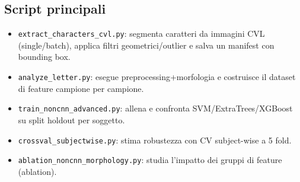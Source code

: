 \documentclass[a4paper,12pt]{article}
\begin{document}
\subsection{Script principali}
\begin{itemize}[leftmargin=1.5em]
  \item \texttt{extract\_characters\_cvl.py}: segmenta caratteri da immagini CVL (single/batch), applica filtri geometrici/outlier e salva un manifest con bounding box.
  \item \texttt{analyze\_letter.py}: esegue preprocessing+morfologia e costruisce il dataset di feature campione per campione.
  \item \texttt{train\_noncnn\_advanced.py}: allena e confronta SVM/ExtraTrees/XGBoost su split holdout per soggetto.
  \item \texttt{crossval\_subjectwise.py}: stima robustezza con CV subject-wise a 5 fold.
  \item \texttt{ablation\_noncnn\_morphology.py}: studia l'impatto dei gruppi di feature (ablation).
\end{itemize}
\end{document}
